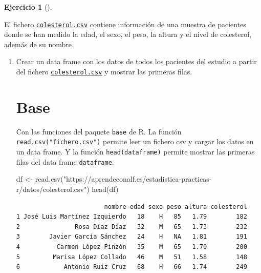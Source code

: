 \documentclass[
  a4paper,
]{scrreport}
\newenvironment{Shaded}{\begin{snugshade}}{\end{snugshade}}
\newcommand{\FunctionTok}[1]{\textcolor[rgb]{0.28,0.35,0.67}{#1}}
\newcommand{\NormalTok}[1]{\textcolor[rgb]{0.00,0.23,0.31}{#1}}
\newcommand{\OtherTok}[1]{\textcolor[rgb]{0.00,0.23,0.31}{#1}}
\newcommand{\StringTok}[1]{\textcolor[rgb]{0.13,0.47,0.30}{#1}}
\theoremstyle{definition}
\newtheorem{exercise}{Ejercicio}[chapter]
\theoremstyle{remark}
\begin{document}
\begin{exercise}[]\protect\hypertarget{exr-dataframes-2}{}\label{exr-dataframes-2}

El fichero \href{datos/colesterol.csv}{\texttt{colesterol.csv}} contiene
información de una muestra de pacientes donde se han medido la edad, el
sexo, el peso, la altura y el nivel de colesterol, además de su nombre.

\begin{enumerate}
\def\labelenumi{\alph{enumi}.}
\item
  Crear un data frame con los datos de todos los pacientes del estudio a
  partir del fichero
  \href{datos/colesterol.csv}{\texttt{colesterol.csv}} y mostrar las
  primeras filas.

  \begin{tcolorbox}[enhanced jigsaw, breakable, toptitle=1mm, colbacktitle=quarto-callout-tip-color!10!white, rightrule=.15mm, opacityback=0, opacitybacktitle=0.6, titlerule=0mm, coltitle=black, colframe=quarto-callout-tip-color-frame, colback=white, bottomtitle=1mm, leftrule=.75mm, toprule=.15mm, title=\textcolor{quarto-callout-tip-color}{\faLightbulb}\hspace{0.5em}{Solución}, arc=.35mm, bottomrule=.15mm, left=2mm]

  \section{Base}

  Con las funciones del paquete \texttt{base} de R. La función
  \texttt{read.csv("fichero.csv")} permite leer un fichero csv y cargar
  los datos en un data frame. Y la función \texttt{head(dataframe)}
  permite mostrar las primeras filas del data frame \texttt{dataframe}.

\begin{Shaded}
\begin{Highlighting}[]
\NormalTok{df }\OtherTok{\textless{}{-}} \FunctionTok{read.csv}\NormalTok{(}\StringTok{"https://aprendeconalf.es/estadistica{-}practicas{-}r/datos/colesterol.csv"}\NormalTok{)}
\FunctionTok{head}\NormalTok{(df)}
\end{Highlighting}
\end{Shaded}

\begin{verbatim}
                        nombre edad sexo peso altura colesterol
1 José Luis Martínez Izquierdo   18    H   85   1.79        182
2               Rosa Díaz Díaz   32    M   65   1.73        232
3        Javier García Sánchez   24    H   NA   1.81        191
4          Carmen López Pinzón   35    M   65   1.70        200
5         Marisa López Collado   46    M   51   1.58        148
6            Antonio Ruiz Cruz   68    H   66   1.74        249
\end{verbatim}


\end{tcolorbox}
\end{enumerate}
\end{exercise}
\end{document}
